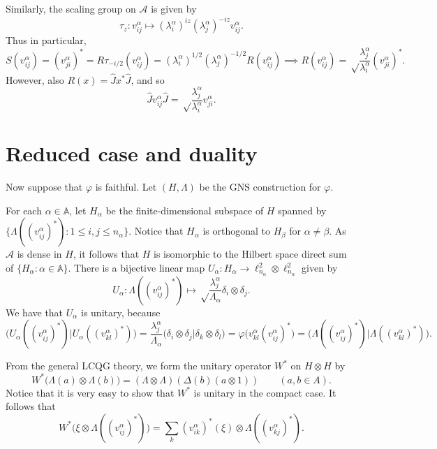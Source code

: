\documentclass[twoside,a4paper,12pt]{article}
\theoremstyle{plain}
\theoremstyle{definition}
\newcommand{\mc}{\mathcal}
\begin{document}
Similarly, the scaling group on $\mc A$ is given by
\[ \tau_z: v^\alpha_{ij} \mapsto
(\lambda^\alpha_i)^{iz} (\lambda^\alpha_j)^{-iz} v^\alpha_{ij}. \]
Thus in particular,
\[ S(v^\alpha_{ij}) = (v^\alpha_{ji})^*
= R \tau_{-i/2}(v^\alpha_{ij})
= (\lambda^\alpha_i)^{1/2} (\lambda^\alpha_j)^{-1/2} R( v^\alpha_{ij} )
\implies
R( v^\alpha_{ij} ) = \sqrt\frac{\lambda^\alpha_j}{\lambda^\alpha_i}
(v^\alpha_{ji})^*. \]
However, also $R(x) = \hat J x^* \hat J$, and so
\[ \hat J v^\alpha_{ij} \hat J = \sqrt\frac{\lambda^\alpha_j}{\lambda^\alpha_i}
v^\alpha_{ji}. \]




\section{Reduced case and duality}

Now suppose that $\varphi$ is faithful.
Let $(H,\Lambda)$ be the GNS construction for $\varphi$.

For each $\alpha\in\mathbb A$, let $H_\alpha$ be the finite-dimensional subspace
of $H$ spanned by $\{ \Lambda((v^\alpha_{ij})^*) : 1\leq i,j\leq n_\alpha \}$.
Notice that $H_\alpha$ is orthogonal to $H_\beta$ for $\alpha\not=\beta$.
As $\mc A$ is dense in $H$, it follows that $H$ is isomorphic to the Hilbert
space direct sum of $\{ H_\alpha : \alpha\in\mathbb A \}$.  There is a
bijective linear map $U_\alpha: H_\alpha \rightarrow \ell^2_{n_\alpha} \otimes
\ell^2_{n_\alpha}$ given by
\[ U_\alpha : \Lambda((v^\alpha_{ij})^*) \mapsto
\sqrt\frac{\lambda^\alpha_j}{\Lambda_\alpha}
\delta_i \otimes \delta_j. \]
We have that $U_\alpha$ is unitary, because
\[ \big( U_\alpha((v^\alpha_{ij})^*) \big| U_\alpha((v^\alpha_{kl})^*) \big)
= \frac{\lambda^\alpha_j}{\Lambda_\alpha} \big( \delta_i\otimes\delta_j \big|
\delta_k\otimes\delta_l \big) 
= \varphi\big( v^\alpha_{kl} (v^\alpha_{ij})^* \big)
= \big( \Lambda((v^\alpha_{ij})^*) \big| \Lambda((v^\alpha_{kl})^*) \big). \]

From the general LCQG theory, we form the unitary operator $W^*$
on $H\otimes H$ by
\[ W^*\big( \Lambda(a) \otimes \Lambda(b) \big)
= (\Lambda\otimes\Lambda)(\Delta(b)(a\otimes 1))
\qquad (a,b\in A). \]
Notice that it is very easy to show that $W^*$ is unitary in the compact case.
It follows that
\[ W^*\big(\xi \otimes \Lambda((v^\alpha_{ij})^*) \big)
= \sum_k (v^\alpha_{ik})^*(\xi) \otimes \Lambda((v^\alpha_{kj})^*). \]
\end{document}
